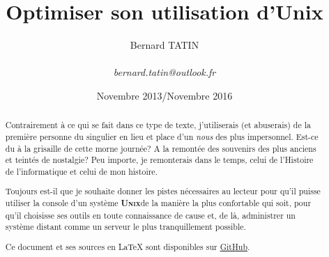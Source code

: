 \documentclass[11pt]{amsart} %
\title{Optimiser son utilisation d'Unix}
\author{Bernard TATIN \\
\small \\
\emph{bernard.tatin@outlook.fr}}
\date{Novembre 2013/Novembre 2016} %
\makeatletter
\newcommand\osname[1]{\textsc{\textbf{#1}}\xspace\index{#1@\textsc{#1}}}
\newcommand\unix{\osname{Unix}}
\makeatother
\begin{document}
\maketitle

\begin{abstract}
Contrairement à ce qui se fait dans ce type de texte, j'utiliserais (et abuserais) de la première personne du singulier en lieu et place d'un \emph{nous} des plus impersonnel. Est-ce du à la grisaille de cette morne journée? A la remontée des souvenirs des plus anciens et teintés de nostalgie? Peu importe, je remonterais dans le temps, celui de l'Histoire de l'informatique et celui de mon histoire.

Toujours est-il que je souhaite donner les pistes nécessaires au lecteur pour qu'il puisse utiliser la console d'un système \unix de la manière la plus confortable qui soit, pour qu'il choisisse ses outils en toute connaissance de cause et, de là, administrer un système distant comme un serveur le plus tranquillement possible.

Ce document et ses sources en \LaTeX{} sont disponibles sur \href{https://github.com/BernardTatin/optimize-unix}{GitHub}.
\end{abstract}

\tableofcontents






\printindex
\end{document}
